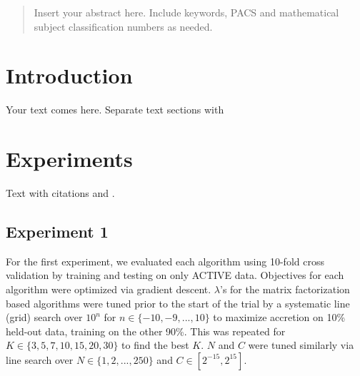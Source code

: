 
\date{Received: date / Accepted: date}


\maketitle

\begin{abstract}
Insert your abstract here. Include keywords, PACS and mathematical
subject classification numbers as needed.
\end{abstract}

\section{Introduction}
\label{intro}
Your text comes here. Separate text sections with

\section{Experiments}
\label{sec:1}
Text with citations \cite{RefB} and \cite{RefJ}.

\subsection{Experiment 1}
\label{sec:2}



For the first experiment, we evaluated each algorithm using 10-fold cross validation by training and testing on only ACTIVE data. Objectives for each algorithm were optimized via gradient descent.
$\lambda$'s for the matrix factorization based algorithms were tuned prior to the start of the trial by a systematic line (grid) search over $10^n$ for $n \in \{-10, -9, ..., 10\}$ to maximize 
accretion on 10\% held-out data, training on the other 90\%. This was repeated for $K \in \{3, 5, 7, 10, 15, 20, 30\}$ to find the best $K$. $N$ and $C$ were tuned similarly via line search 
over $N \in \{1, 2,..., 250\}$ and $C \in [2^{-15}, 2^{15}]$.

